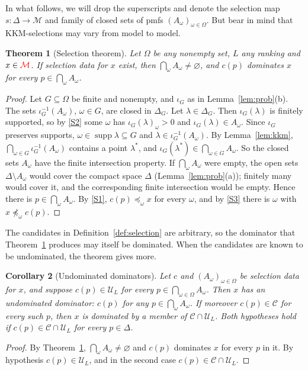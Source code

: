 \documentclass[11pt]{article}
\newcommand{\chg}[1]{{\color{red}#1}}
\newtheorem{theorem}{Theorem}[section]
\newtheorem{corollary}[theorem]{Corollary}
\theoremstyle{definition}
\theoremstyle{remark}
\newcommand{\M}{\mathcal M}
\newcommand{\C}{\mathcal C}
\newcommand{\U}{\mathcal U}
\newcommand{\supp}{\operatorname{supp}}
\begin{document}
In what follows, we will drop the superscripts and denote the selection map $s:\Delta\to\M$ and family of closed sets of pmfs $(A_\omega)_{\omega\in\Omega}$. But bear in mind that KKM-selections may vary from model to model. 


\begin{theorem}[Selection theorem]\label{thm:selection}
Let $\Omega$ be any nonempty set, $L$ any ranking and $x\in\chg{\M}$. If selection data for $x$ exist, then $\bigcap_\omega A_\omega\ne\varnothing$, and $c(p)$ dominates $x$ for every $p\in\bigcap_\omega A_\omega$.
\end{theorem}
\begin{proof}
Let $G\subseteq\Omega$ be finite and nonempty, and $\iota_G$ as in Lemma~\ref{lem:prob}(b). The sets $\iota_G^{-1}(A_\omega)$, $\omega\in G$, are closed in $\Delta_G$. Let $\lambda\in\Delta_G$. Then $\iota_G(\lambda)$ is finitely supported, so by \ref{S2} some $\omega$ has $\iota_G(\lambda)_\omega>0$ and $\iota_G(\lambda)\in A_\omega$. Since $\iota_G$ preserves supports, $\omega\in\supp\lambda\subseteq G$ and $\lambda\in\iota_G^{-1}(A_\omega)$. By Lemma~\ref{lem:kkm}, $\bigcap_{\omega\in G}\iota_G^{-1}(A_\omega)$ contains a point $\lambda^*$, and $\iota_G(\lambda^*)\in\bigcap_{\omega\in G}A_\omega$. So the closed sets $A_\omega$ have the finite intersection property. If $\bigcap_\omega A_\omega$ were empty, the open sets $\Delta\setminus A_\omega$ would cover the compact space $\Delta$ (Lemma~\ref{lem:prob}(a)); finitely many would cover it, and the corresponding finite intersection would be empty. Hence there is $p\in\bigcap_\omega A_\omega$. By \ref{S1}, $c(p)\preceq_\omega x$ for every $\omega$, and by \ref{S3} there is $\omega$ with $x\not\preceq_\omega c(p)$.
\end{proof}

The candidates in Definition~\ref{def:selection} are arbitrary, so the dominator that Theorem~\ref{thm:selection} produces may itself be dominated. When the candidates are known to be undominated, the theorem gives more.

\begin{corollary}[Undominated dominators]\label{cor:undominated-dominators}
Let $c$ and $(A_\omega)_{\omega\in\Omega}$ be selection data for $x$, and suppose $c(p)\in\U_L$ for every $p\in\bigcap_{\omega\in\Omega}A_\omega$. Then $x$ has an undominated dominator: $c(p)$ for any $p\in\bigcap_\omega A_\omega$. If moreover $c(p)\in\C$ for every such $p$, then $x$ is dominated by a member of $\C\cap\U_L$. Both hypotheses hold if $c(p)\in\C\cap\U_L$ for every $p\in\Delta$.
\end{corollary}
\begin{proof}
By Theorem~\ref{thm:selection}, $\bigcap_\omega A_\omega\neq\varnothing$ and $c(p)$ dominates $x$ for every $p$ in it. By hypothesis $c(p)\in\U_L$, and in the second case $c(p)\in\C\cap\U_L$.
\end{proof}
\end{document}
